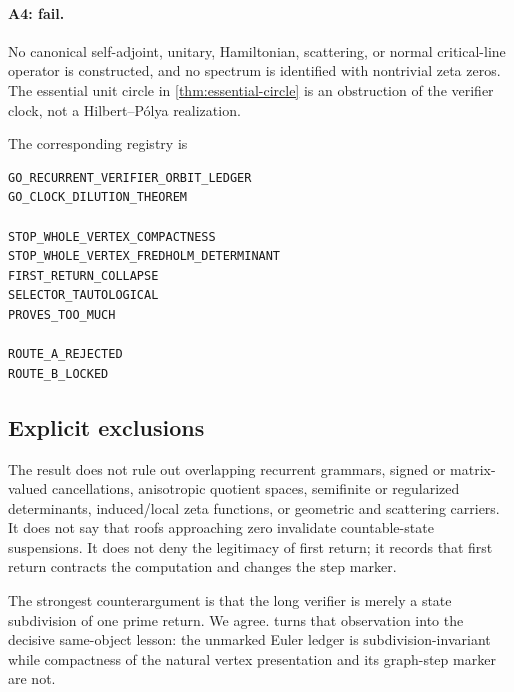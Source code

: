 \paragraph{A4: fail.}
No canonical self-adjoint, unitary, Hamiltonian, scattering, or normal
critical-line operator is constructed, and no spectrum is identified with
nontrivial zeta zeros.  The essential unit circle in
\cref{thm:essential-circle} is an obstruction of the verifier clock, not a
Hilbert--Pólya realization.

The corresponding registry is
\begin{verbatim}
GO_RECURRENT_VERIFIER_ORBIT_LEDGER
GO_CLOCK_DILUTION_THEOREM

STOP_WHOLE_VERTEX_COMPACTNESS
STOP_WHOLE_VERTEX_FREDHOLM_DETERMINANT
FIRST_RETURN_COLLAPSE
SELECTOR_TAUTOLOGICAL
PROVES_TOO_MUCH

ROUTE_A_REJECTED
ROUTE_B_LOCKED
\end{verbatim}

\subsection{Explicit exclusions}

The result does not rule out overlapping recurrent grammars, signed or
matrix-valued cancellations, anisotropic quotient spaces, semifinite or
regularized determinants, induced/local zeta functions, or geometric and
scattering carriers.  It does not say that roofs approaching zero invalidate
countable-state suspensions.  It does not deny the legitimacy of first return;
it records that first return contracts the computation and changes the step
marker.

The strongest counterargument is that the long verifier is merely a state
subdivision of one prime return.  We agree.
 turns that observation into the decisive same-object
lesson: the unmarked Euler ledger is subdivision-invariant while compactness
of the natural vertex presentation and its graph-step marker are not.
